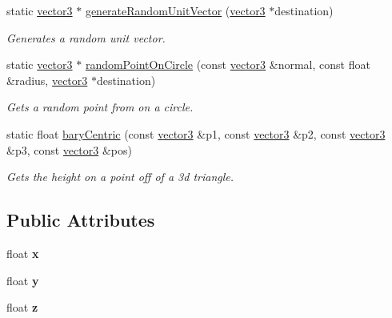\begin{DoxyCompactItemize}
static \hyperlink{classflounder_1_1vector3}{vector3} $\ast$ \hyperlink{classflounder_1_1vector3_a6c8eeac56a831b4e3ca221e19f86031e}{generate\+Random\+Unit\+Vector} (\hyperlink{classflounder_1_1vector3}{vector3} $\ast$destination)
\begin{DoxyCompactList}\small\item\em Generates a random unit vector. \end{DoxyCompactList}\item 
static \hyperlink{classflounder_1_1vector3}{vector3} $\ast$ \hyperlink{classflounder_1_1vector3_a70876957cd503a2c1d3189906042d1ae}{random\+Point\+On\+Circle} (const \hyperlink{classflounder_1_1vector3}{vector3} \&normal, const float \&radius, \hyperlink{classflounder_1_1vector3}{vector3} $\ast$destination)
\begin{DoxyCompactList}\small\item\em Gets a random point from on a circle. \end{DoxyCompactList}\item 
static float \hyperlink{classflounder_1_1vector3_a5b1cacfef8116eaf8a9b56db239e665d}{bary\+Centric} (const \hyperlink{classflounder_1_1vector3}{vector3} \&p1, const \hyperlink{classflounder_1_1vector3}{vector3} \&p2, const \hyperlink{classflounder_1_1vector3}{vector3} \&p3, const \hyperlink{classflounder_1_1vector3}{vector3} \&pos)
\begin{DoxyCompactList}\small\item\em Gets the height on a point off of a 3d triangle. \end{DoxyCompactList}\end{DoxyCompactItemize}
\subsection*{Public Attributes}
\begin{DoxyCompactItemize}
\item 
\mbox{\label{classflounder_1_1vector3_a129d0087d50679ff44ac6ca5f477a476}} 
float {\bfseries x}
\item 
\mbox{\label{classflounder_1_1vector3_ac1234179ec337e6fb90ba343b8701056}} 
float {\bfseries y}
\item 
\mbox{\label{classflounder_1_1vector3_a200d911afd7aedef38ed41f2a7351161}} 
float {\bfseries z}
\end{DoxyCompactItemize}


